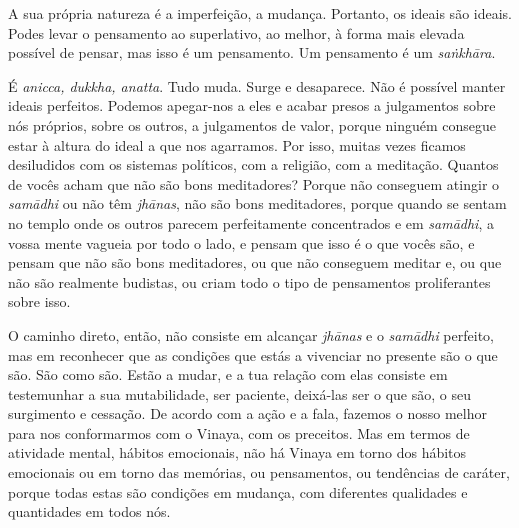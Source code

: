 A sua própria natureza é a imperfeição, a mudança. Portanto, os ideais são
ideais. Podes levar o pensamento ao superlativo, ao melhor, à forma mais elevada
possível de pensar, mas isso é um pensamento. Um pensamento é um \emph{saṅkhāra}.

É \emph{anicca, dukkha, anatta}. Tudo muda. Surge e desaparece. Não é possível manter
ideais perfeitos. Podemos apegar-nos a eles e acabar presos a julgamentos sobre
nós próprios, sobre os outros, a julgamentos de valor, porque ninguém consegue
estar à altura do ideal a que nos agarramos. Por isso, muitas vezes ficamos
desiludidos com os sistemas políticos, com a religião, com a meditação. Quantos
de vocês acham que não são bons meditadores? Porque não conseguem atingir o
\emph{samādhi} ou não têm \emph{jhānas}, não são bons meditadores, porque quando se sentam no
templo onde os outros parecem perfeitamente concentrados e em \emph{samādhi}, a vossa
mente vagueia por todo o lado, e pensam que isso é o que vocês são, e pensam que
não são bons meditadores, ou que não conseguem meditar e, ou que não são
realmente budistas, ou criam todo o tipo de pensamentos proliferantes sobre
isso.

O caminho direto, então, não consiste em alcançar \emph{jhānas} e o \emph{samādhi} perfeito,
mas em reconhecer que as condições que estás a vivenciar no presente são o que
são. São como são. Estão a mudar, e a tua relação com elas consiste em
testemunhar a sua mutabilidade, ser paciente, deixá-las ser o que são, o seu
surgimento e cessação. De acordo com a ação e a fala, fazemos o nosso melhor
para nos conformarmos com o Vinaya, com os preceitos. Mas em termos de atividade
mental, hábitos emocionais, não há Vinaya em torno dos hábitos emocionais ou em
torno das memórias, ou pensamentos, ou tendências de caráter, porque todas estas
são condições em mudança, com diferentes qualidades e quantidades em todos nós.

